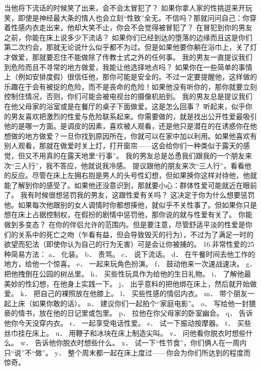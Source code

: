 \documentclass[12pt,UTF8]{ctexbook}
\begin{document}
当他将下流话的时候笑了出来，会不会太冒犯了？
如果你拿人家的性挑逗来开玩笑，即使是神经最大条的情人也会立刻“性致”全无。不信吗？那就问问自己：你穿着性感内衣走出来，他却大笑不止，你会不会觉得被冒犯了？
在冒犯到你的男友之前，你能在床上说多少下流话？
如果你们已经到达的堕落的边缘而且这是你们第二次约会，那就无论说什么似乎都不为过。但是如果他要你躺在浴巾上，关了灯才做爱，那就要忍住不能做除了传教士式之外的任何事。
我的男友一直提议我们到危险而且不寻常的地方做爱，我能让他选择地点吗？
如果你在一些简单的事情上（例如安排度假）很信任他，那你可能是安全的。不过一定要提醒他，这样做的乐趣在于会有被捉的危险，而不是丧命的危险！如果他没有听你的，那你就要立刻控制住情况，否则，你们可能会被电视台的摄像机拍到。
我的男友总是提议我们在他父母家的浴室或是在餐厅的桌子下面做爱。这是怎么回事？
听起来，似乎你的男友喜欢把激烈的性爱与危险联系起来。你需要做的，就是找出公开性爱最吸引他的是哪一方面。是调皮的因素，喜欢被人观看，还是他只是潜在的在诱惑你在他想做的地方做爱？一旦你找到原因所在，你就可以在家中加以利用。如果他喜欢有别人观看，那就在做爱时关上灯，打开窗帘——这会给你们一种类似于露天的感觉，但又不用真的在露天地里“行事”。
我的男友总是怂恿我们跟我的一个朋友来次“三人行”，我不答应，他就说我冷感。
提议跟他的朋友来次“三人行”，看看他的反应。尽管在床上左拥右抱是男人的头号性幻想，但如果换你这样对待他，他就能了解到你的感受了。如果他还没意识到，那就要小心：群体性爱可能就近在眼前了。
我有时候很想惩罚我的男友，这跟性爱有关吗？
这决定于你为什么想要惩罚他。如果每次他跟别的女人调情时你都想揍他，就似乎不关性事了。但如果你只是想在床上占据控制权，在假扮的剧情中惩罚他，那你说的就与性爱有关了。
你能做到多变态？
在你的伴侣允许的范围内。但是要注意，尽管舒适平淡的性爱是你们的关系中的死亡之吻（乍看有益，但会导致毁灭的行为），不过为了满足一时的欲望而犯法（即使你认为自己的行为无害）可是会让你被捕的。
16.非常性爱的25种简易方法：
a． 化装。
b． 责骂。
c． 说下流话。
d． 在午餐时间去他工作的地方，给他一个惊喜。
e． 一起来玩角色扮演。
f． 鼓动他来一次速战速决。
g． 把他拽倒在公园的树丛里。
h． 买些性玩具作为给他的生日礼物。
i． 了解他最美妙的性幻想，在他身上实践一下。
j． 出乎意料的把他绑在床上，然后就开始做爱。
k． 把自己的裸照放在他膝上。
l． 买些性感的情侣内衣。
m． 带个朋友一起上床（如果你敢的话）。
n． 建议你们一起拍个“家庭电影”。
o． 写给他一封猥亵的情书，放在他的日记里或包里。
p． 拉他在你父母家的卧室幽会。
q． 告诉他你今天没穿内衣。
r． 一起享受电话性爱。
s． 试一下振动按摩器。
t． 买些丝巾挂在床上。
u． 用鞭子和冰块在床上制造尖叫。
v． 问他看你脱衣时想些什么。
w． 告诉他你脱衣时想些什么。
x． 试一下“性节食”，你们俩人在一周内只“说”不“做”。
y． 整个周末都一起在床上度过——你会为你们所达到的程度而惊奇。
\end{document}
